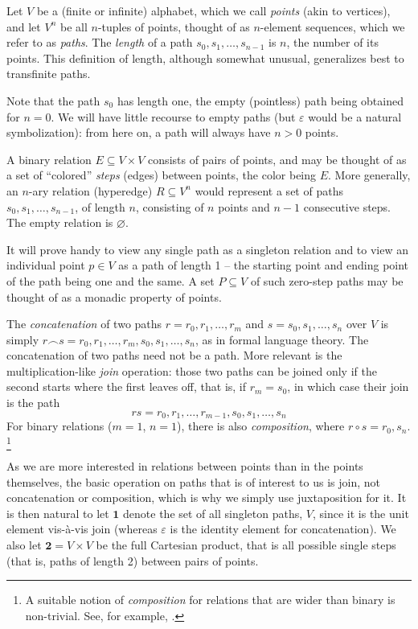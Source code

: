 \documentclass{llncs}
\newcommand{\ABC}{V}
\newcommand{\Pair}{\textbf{2}}
\newcommand{\One}{\textbf{1}}
\begin{document}
Let $\ABC$ be a (finite or infinite) alphabet, which we call
\emph{points} (akin to vertices), and let $\ABC^n$ be all $n$-tuples
of points, thought of as $n$-element sequences, which we refer to as
\emph{paths}.  The \emph{length} of a path $s_0,s_1,\ldots,s_{n-1}$ is
$n$, the number of its points.  This definition of
length, although somewhat unusual, generalizes best to transfinite paths.

Note that the path $s_0$ has length
one, the empty (pointless) path being obtained for $n=0$.  We
will have little recourse to empty paths (but $\varepsilon$ would be a
natural symbolization): from here on, a path will always have $n> 0$ points.

A binary relation $E\subseteq\ABC\times\ABC$ consists of pairs of
points, and may be thought of as a set of ``colored'' \emph{steps}
(edges) between points, the color being $E$.  More generally, an $n$-ary
relation (hyperedge) $R\subseteq \ABC^n$ would represent a set of
paths $s_0,s_1,\ldots,s_{n-1}$, of length $n$, consisting of $n$
points and $n-1$ consecutive steps.  The empty relation is
$\varnothing$.

It will prove handy to view any single path as a singleton relation
and to view an individual point $p\in\ABC$ as a path of length 1 -- the
starting point and ending point of the path being one and the same.  A
set $P\subseteq\ABC$ of such zero-step paths may be thought of as a
monadic property of points. 


The \emph{concatenation} of two paths $r=r_0,r_1,\ldots,r_m$ and
$s=s_0,s_1,\ldots,s_n$ over $\ABC$ is simply $r{\smallfrown}
s=r_0,r_1,\ldots,r_m,s_0,s_1,\ldots,s_n$, as in formal language
theory. The concatenation of two paths need not be a path. More
relevant is the multiplication-like \emph{join} operation: those two
paths can be joined only if the second starts where the first leaves
off, that is, if $r_m=s_0$, in which case their join is the path
\[
r s = r_0,r_1,\ldots,r_{m-1},s_0,s_1,\ldots,s_n
\]
For binary relations ($m=1$, $n=1$), there is also \emph{composition},
where $r\circ s= r_0,s_n$.%
\footnote{A suitable notion of \emph{composition} for relations that
  are wider than binary is non-trivial.  See, for example, \cite{Marx}.}

As we are more interested in relations between points than in the
points themselves, the basic operation on paths that is of interest to
us is join, not concatenation or composition, which is why we simply
use juxtaposition for it.  It is then natural to let $\One$ denote the
set of all singleton paths, $\ABC$, since it is the unit element
vis-\`a-vis join (whereas $\varepsilon$ is the identity element for
concatenation).  We also let $\Pair=\ABC\times\ABC$ be the full
Cartesian product, that is all possible single steps (that is, paths of
length 2) between pairs of points.
\end{document}
